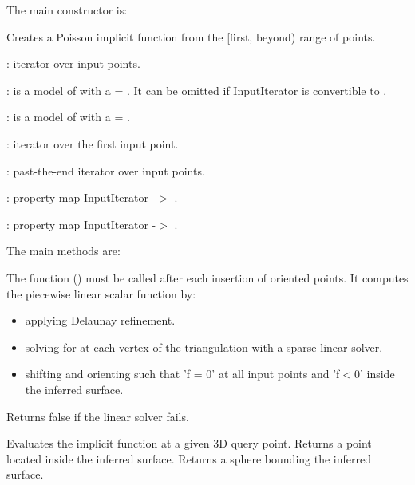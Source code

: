 The main constructor is:

{
Creates a Poisson implicit function from the [first, beyond) range of points.
\begin{description}
\item {}: iterator over input points. \item {}: is a model of  with a  = . It can be omitted if InputIterator  is convertible to . \item {}: is a model of  with a  = . \end{description}
\begin{description}
\item {}: iterator over the first input point. \item {}: past-the-end iterator over input points. \item {}: property map InputIterator -$>$ . \item {}: property map InputIterator -$>$ . \end{description}
}

The main methods are:

{
The function () must be called after each insertion of oriented points. It computes the piecewise linear scalar function  by:\begin{itemize}
\item applying Delaunay refinement.\item solving for  at each vertex of the triangulation with a sparse linear solver.\item shifting and orienting  such that 'f = 0' at all input points and 'f$<$0' inside the inferred surface.\end{itemize}
Returns false if the linear solver fails.
}
\ccGlue
{}
{
Evaluates the implicit function at a given 3D query point.
}
\ccGlue
{}
{
Returns a point located inside the inferred surface.
}
{
Returns a sphere bounding the inferred surface.
}

